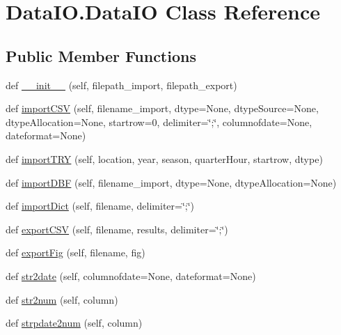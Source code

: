 \hypertarget{class_data_i_o_1_1_data_i_o}{}\section{Data\+I\+O.\+Data\+IO Class Reference}
\label{class_data_i_o_1_1_data_i_o}
\subsection*{Public Member Functions}
\begin{DoxyCompactItemize}
\item 
def \hyperlink{class_data_i_o_1_1_data_i_o_a98bdded980e8bfc4ddaa1cd12a8392fe}{\+\_\+\+\_\+init\+\_\+\+\_\+} (self, filepath\+\_\+import, filepath\+\_\+export)
\item 
def \hyperlink{class_data_i_o_1_1_data_i_o_aa79466ed985916b447e97c1b501ff30c}{import\+C\+SV} (self, filename\+\_\+import, dtype=None, dtype\+Source=None, dtype\+Allocation=None, startrow=0, delimiter=\char`\"{};\char`\"{}, columnofdate=None, dateformat=None)
\item 
def \hyperlink{class_data_i_o_1_1_data_i_o_a232251f90f75e5e8e307a035f191d1c4}{import\+T\+RY} (self, location, year, season, quarter\+Hour, startrow, dtype)
\item 
def \hyperlink{class_data_i_o_1_1_data_i_o_a6c56e9c0444c5bfd36093fcd966053b0}{import\+D\+BF} (self, filename\+\_\+import, dtype=None, dtype\+Allocation=None)
\item 
def \hyperlink{class_data_i_o_1_1_data_i_o_a57bc5372c9aa1d722c0d8e0cf1b749dd}{import\+Dict} (self, filename, delimiter=\char`\"{};\char`\"{})
\item 
def \hyperlink{class_data_i_o_1_1_data_i_o_a945b9f613d7eb68756a1483c8d8d7419}{export\+C\+SV} (self, filename, results, delimiter=\char`\"{};\char`\"{})
\item 
def \hyperlink{class_data_i_o_1_1_data_i_o_a4929b9de8bce15ad8e1fc432eb5167f9}{export\+Fig} (self, filename, fig)
\item 
def \hyperlink{class_data_i_o_1_1_data_i_o_a59071592ed63d8d505677035fd5ebda1}{str2date} (self, columnofdate=None, dateformat=None)
\item 
def \hyperlink{class_data_i_o_1_1_data_i_o_ae42c01ae3b0f343c292cb199327106f5}{str2num} (self, column)
\item 
def \hyperlink{class_data_i_o_1_1_data_i_o_a14e038023e1dd43e8c0a18842b4b73fb}{strpdate2num} (self, column)
\end{DoxyCompactItemize}


